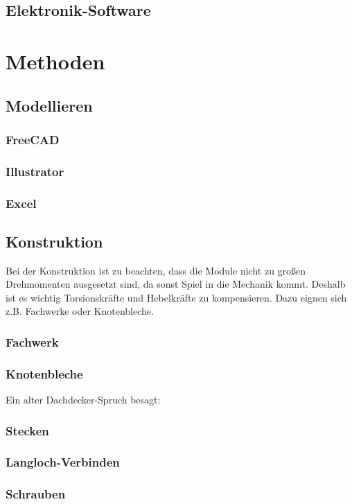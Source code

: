 \documentclass[
	a4paper,
	smallheadings,
	german,
	]
	{scrreprt}
\begin{document}
\section{Elektronik-Software}

\chapter{Methoden}

\section{Modellieren}
	\subsection{FreeCAD}
	\subsection{Illustrator}
	\subsection{Excel}
\section{Konstruktion}
Bei der Konstruktion ist zu beachten, dass die Module nicht zu großen Drehmomenten ausgesetzt sind, da sonst Spiel in die Mechanik kommt.
Deshalb ist es wichtig Torsionskräfte und Hebelkräfte zu kompensieren.
Dazu eignen sich z.B. Fachwerke oder Knotenbleche.
	\subsection{Fachwerk}
	\subsection{Knotenbleche}
Ein alter Dachdecker-Spruch besagt: 
	\subsection{Stecken}
	\subsection{Langloch-Verbinden}
	\subsection{Schrauben}
\end{document}

